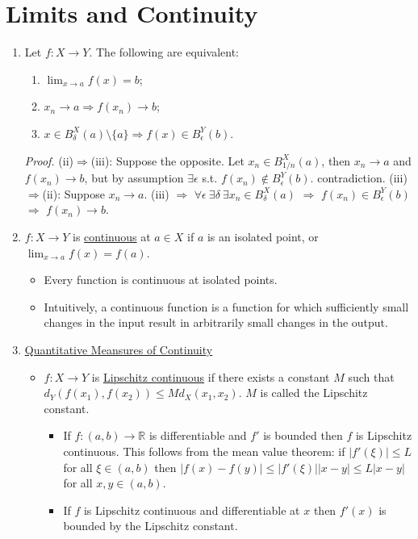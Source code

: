 \documentclass[%
 aip,
 jmp,%
 amsmath,amssymb,
 reprint,%
]{revtex4-1}
\def\R{{\mathbb R}}
\def\d{\delta}
\def\e{\epsilon}
\renewenvironment{proof}{\color{gray}\footnotesize\emph{Proof.}}{}
\newcommand{\imply}{\Rightarrow}
\newcommand{\defn}[1]{\underline{#1}}
\begin{document}
\section {Limits and Continuity}
\begin{enumerate}
  \item Let $f: X \to Y$. The following are equivalent:
      \begin{enumerate}
        \item $\lim_{x \to a} f(x) = b$;
        \item $x_n \to a  \imply  f(x_n) \to b$;
        \item $x \in B_{\d}^{X}(a)\setminus\{a\} \imply f(x) \in B_{\e}^{Y}(b)$.
      \end{enumerate}
      \begin{proof}
        (ii)$\imply$(iii): Suppose the opposite. Let $x_n \in B_{1/n}^{X}(a)$,
        then $x_n \to a$ and $f(x_n) \to b$, but by assumption $\exists\e$ s.t.
        $f(x_n)\notin B_{\e}^{Y}(b)$. contradiction.
        (iii)$\imply$(ii): Suppose $x_n \to a$. (iii) $\imply$
        $\forall\e\ \exists\d\ \exists x_n\in B_{\d}^{X}(a)$ $\imply$
        $f(x_n)\in B_{\e}^{Y}(b)$ $\imply$ $f(x_n)\to b$.
      \end{proof}

  \item $f: X \to Y$ is \defn{continuous} at $a \in X$ if
  $a$ is an isolated point, or $\lim_{x\to a} f(x)=f(a)$.
      \begin{itemize}
        \item Every function is continuous at isolated points.
        \footnotesize
        \item Intuitively, a continuous function is a function for which
        sufficiently small changes in the input result in arbitrarily small
        changes in the output.
      \end{itemize}

  \item \defn{Quantitative Meansures of Continuity}
      \begin{itemize}
        \item $f:X \to Y$ is \defn{Lipschitz continuous} if there exists a
        constant $M$ such that $d_Y(f(x_1), f(x_2)) \leq M d_X(x_1,x_2)$.
        $M$ is called the Lipschitz constant.
        {\footnotesize
            \begin{itemize}
                \item If $f:(a,b)\to\R$ is differentiable and $f′$ is bounded then $f$
                is Lipschitz continuous.
                {\color{gray}
                  This follows from the mean value theorem: if
                  $|f′(\xi)| \le L$ for all $\xi\in(a,b)$ then
                  $|f(x)-f(y)| \le |f′(\xi)||x-y| \le L|x-y|$ for all $x,y\in(a,b)$.
                }
                \item If $f$ is Lipschitz continuous and differentiable at $x$
                then $f′(x)$ is bounded by the Lipschitz constant.
            \end{itemize}
        }


\end{itemize}
\end{enumerate}
\end{document}
